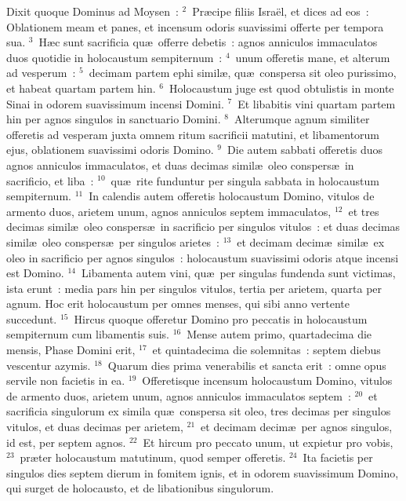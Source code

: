\lettrine[lines=3,image=true,loversize=0.05,lraise=-0.03]{D}{}ixit quoque Dominus ad Moysen~:
${}^{2}$~Pr\ae cipe filiis Isra\"el, et dices ad eos~: Oblationem meam et panes, et incensum odoris suavissimi offerte per tempora sua.
${}^{3}$~H\ae c sunt sacrificia qu\ae\ offerre debetis~: agnos anniculos immaculatos duos quotidie in holocaustum sempiternum~:
${}^{4}$~unum offeretis mane, et alterum ad vesperum~:
${}^{5}$~decimam partem ephi simil\ae , qu\ae\ conspersa sit oleo purissimo, et habeat quartam partem hin.
${}^{6}$~Holocaustum juge est quod obtulistis in monte Sinai in odorem suavissimum incensi Domini.
${}^{7}$~Et libabitis vini quartam partem hin per agnos singulos in sanctuario Domini.
${}^{8}$~Alterumque agnum similiter offeretis ad vesperam juxta omnem ritum sacrificii matutini, et libamentorum ejus, oblationem suavissimi odoris Domino.
${}^{9}$~Die autem sabbati offeretis duos agnos anniculos immaculatos, et duas decimas simil\ae\ oleo conspers\ae\ in sacrificio, et liba~:
${}^{10}$~qu\ae\ rite funduntur per singula sabbata in holocaustum sempiternum.
${}^{11}$~In calendis autem offeretis holocaustum Domino, vitulos de armento duos, arietem unum, agnos anniculos septem immaculatos,
${}^{12}$~et tres decimas simil\ae\ oleo conspers\ae\ in sacrificio per singulos vitulos~: et duas decimas simil\ae\ oleo conspers\ae\ per singulos arietes~:
${}^{13}$~et decimam decim\ae\ simil\ae\ ex oleo in sacrificio per agnos singulos~: holocaustum suavissimi odoris atque incensi est Domino.
${}^{14}$~Libamenta autem vini, qu\ae\ per singulas fundenda sunt victimas, ista erunt~: media pars hin per singulos vitulos, tertia per arietem, quarta per agnum. Hoc erit holocaustum per omnes menses, qui sibi anno vertente succedunt.
${}^{15}$~Hircus quoque offeretur Domino pro peccatis in holocaustum sempiternum cum libamentis suis.
${}^{16}$~Mense autem primo, quartadecima die mensis, Phase Domini erit,
${}^{17}$~et quintadecima die solemnitas~: septem diebus vescentur azymis.
${}^{18}$~Quarum dies prima venerabilis et sancta erit~: omne opus servile non facietis in ea.
${}^{19}$~Offeretisque incensum holocaustum Domino, vitulos de armento duos, arietem unum, agnos anniculos immaculatos septem~:
${}^{20}$~et sacrificia singulorum ex simila qu\ae\ conspersa sit oleo, tres decimas per singulos vitulos, et duas decimas per arietem,
${}^{21}$~et decimam decim\ae\ per agnos singulos, id est, per septem agnos.
${}^{22}$~Et hircum pro peccato unum, ut expietur pro vobis,
${}^{23}$~pr\ae ter holocaustum matutinum, quod semper offeretis.
${}^{24}$~Ita facietis per singulos dies septem dierum in fomitem ignis, et in odorem suavissimum Domino, qui surget de holocausto, et de libationibus singulorum.
